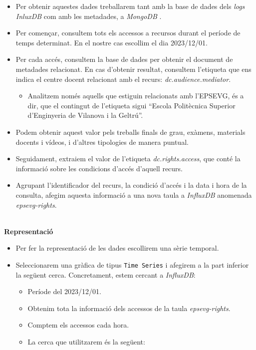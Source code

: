 \begin{itemize}
    \item Per obtenir aquestes dades treballarem tant amb la base de dades dels \textit{\gls{log}s} \textit{InluxDB} com amb les metadades, a \textit{MongoDB} .
    \item Per començar, consultem tots els accessos a recursos durant el període de temps determinat.
    En el nostre cas escollim el dia 2023/12/01.
    \item Per cada accés, consultem la base de dades per obtenir el document de metadades relacionat.
    En cas d'obtenir resultat, consultem l'etiqueta que ens indica el centre docent relacionat amb el recurs: \textit{dc.audience.mediator}.
    \begin{itemize}
        \item Analitzem només aquells que estiguin relacionats amb l'EPSEVG, és a dir, que el contingut de l'etiqueta sigui ``Escola Politècnica Superior d'Enginyeria de Vilanova i la Geltrú''.
    \end{itemize}
    \item Podem obtenir aquest valor pels treballs finals de grau, exàmens, materials docents i vídeos, i d'altres tipologies de manera puntual.
    \item Seguidament, extraiem el valor de l'etiqueta \textit{dc.rights.access}, que conté la informació sobre les condicions d'accés d'aquell recurs.
    \item Agrupant l'identificador del recurs, la condició d'accés i la data i hora de la consulta, afegim aquesta informació a una nova taula a \textit{InfluxDB} anomenada \textit{epsevg-rights}.

\end{itemize}

\clearpage

\noindent \\
\textbf{Representació}

\begin{itemize}
    \item Per fer la representació de les dades escollirem una sèrie temporal.
    \item Seleccionarem una gràfica de tipus \texttt{Time Series} i afegirem a la part inferior la següent cerca.
    Concretament, estem cercant a \textit{InfluxDB}:
    \begin{itemize}
        \item Període del 2023/12/01.
        \item Obtenim tota la informació dels accessos de la taula \textit{epsevg-rights}.
        \item Comptem els accessos cada hora.
        \item La cerca que utilitzarem és la següent:
    \end{itemize}
\end{itemize}

